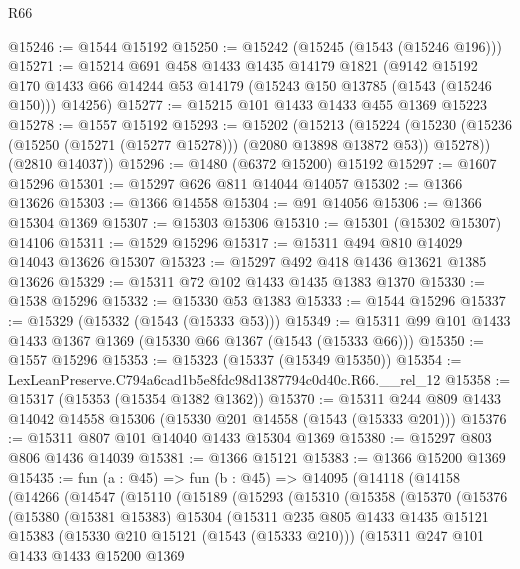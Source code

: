 \begin{lexlean}{R66}
\begin{coremodule}
@15246 := @1544 @15192
@15250 := @15242 (@15245 (@1543 (@15246 @196)))
@15271 := @15214
    @691
    @458
    @1433
    @1435
    @14179
    @1821
    (@9142
      @15192
      @170
      @1433
      @66
      @14244
      @53
      @14179
      (@15243 @150 @13785 (@1543 (@15246 @150)))
      @14256)
@15277 := @15215 @101 @1433 @1433 @455 @1369 @15223
@15278 := @1557 @15192
@15293 := @15202
    (@15213
      (@15224 (@15230 (@15236 (@15250 (@15271 (@15277 @15278))) (@2080 @13898 @13872 @53)) @15278))
      (@2810 @14037))
@15296 := @1480 (@6372 @15200) @15192
@15297 := @1607 @15296
@15301 := @15297 @626 @811 @14044 @14057
@15302 := @1366 @13626
@15303 := @1366 @14558
@15304 := @91 @14056
@15306 := @1366 @15304 @1369
@15307 := @15303 @15306
@15310 := @15301 (@15302 @15307) @14106
@15311 := @1529 @15296
@15317 := @15311 @494 @810 @14029 @14043 @13626 @15307
@15323 := @15297 @492 @418 @1436 @13621 @1385 @13626
@15329 := @15311 @72 @102 @1433 @1435 @1383 @1370
@15330 := @1538 @15296
@15332 := @15330 @53 @1383
@15333 := @1544 @15296
@15337 := @15329 (@15332 (@1543 (@15333 @53)))
@15349 := @15311 @99 @101 @1433 @1433 @1367 @1369 (@15330 @66 @1367 (@1543 (@15333 @66)))
@15350 := @1557 @15296
@15353 := @15323 (@15337 (@15349 @15350))
@15354 := LexLeanPreserve.C794a6cad1b5e8fdc98d1387794c0d40c.R66.__rel_12
@15358 := @15317 (@15353 (@15354 @1382 @1362))
@15370 := @15311 @244 @809 @1433 @14042 @14558 @15306 (@15330 @201 @14558 (@1543 (@15333 @201)))
@15376 := @15311 @807 @101 @14040 @1433 @15304 @1369
@15380 := @15297 @803 @806 @1436 @14039
@15381 := @1366 @15121
@15383 := @1366 @15200 @1369
@15435 := fun (a : @45) =>
  fun (b : @45) =>
  @14095
    (@14118
      (@14158
        (@14266
          (@14547
            (@15110
              (@15189
                (@15293
                  (@15310
                    (@15358
                      (@15370
                        (@15376
                          (@15380
                            (@15381 @15383)
                            @15304
                            (@15311
                              @235
                              @805
                              @1433
                              @1435
                              @15121
                              @15383
                              (@15330 @210 @15121 (@1543 (@15333 @210)))
                              (@15311
                                @247
                                @101
                                @1433
                                @1433
                                @15200
                                @1369

\end{coremodule}
\end{lexlean}
